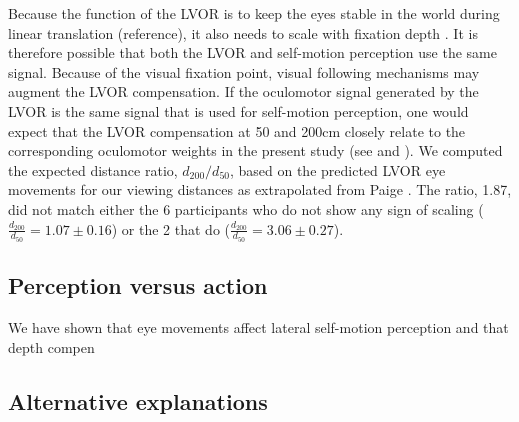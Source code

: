 Because the function of the LVOR is to keep the eyes stable in the world during linear translation (reference), it also needs to scale with fixation depth \cite{paige1989, busettini1994,paige1998}. It is therefore possible that both the LVOR and self-motion perception use the same signal. Because of the visual fixation point, visual following mechanisms may augment the LVOR compensation. If the oculomotor signal generated by the LVOR is the same signal that is used for self-motion perception, one would expect that the LVOR compensation at 50 and 200cm closely relate to the corresponding oculomotor weights in the present study (see  and ). We computed the expected distance ratio, $d_{200} / d_{50}$, based on the predicted LVOR eye movements for our viewing distances as extrapolated from Paige \citeyear{1989}. The ratio, 1.87, did not match either the 6 participants who do not show any sign of scaling ($\frac{d_{200}}{d_{50}} = 1.07 \pm 0.16$) or the 2 that do ($\frac{d_{200}}{d_{50}} = 3.06 \pm 0.27$).

\subsection{Perception versus action}

We have shown that eye movements affect lateral self-motion perception and that depth compen
%
%






\subsection{Alternative explanations}

